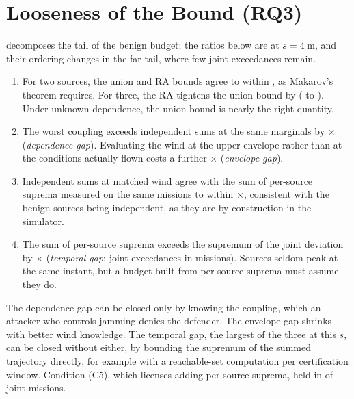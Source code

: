 \section{Looseness of the Bound (RQ3)}
\label{app:rq3}
 decomposes the tail of the benign budget; the ratios below are
at $s=4$\,m, and their ordering changes in the far tail, where few joint
exceedances remain.
\begin{enumerate}
\item For two sources, the union and RA bounds agree to within
  \nUnionRaDtwoMaxErr{}, as Makarov's theorem requires. For three, the RA
  tightens the union bound by \nRaGain{} (\nGapUnion{} to \nGapRa{}). Under
  unknown dependence, the union bound is nearly the right quantity.
\item The worst coupling exceeds independent sums at the same marginals by
  \nDepRatio$\times$ (\emph{dependence gap}). Evaluating the wind at the upper
  envelope rather than at the conditions actually flown costs a further
  \nEnvRatio$\times$ (\emph{envelope gap}).
\item Independent sums at matched wind agree with the sum of per-source
  suprema measured on the same missions to within \nNatRatio$\times$,
  consistent with the benign sources being independent, as they are by
  construction in the simulator.
\item The sum of per-source suprema exceeds the supremum of the joint deviation
  by \nTimeRatio$\times$ (\emph{temporal gap}; \nGapJointK{} joint exceedances in
  \nJointMissions{} missions). Sources seldom peak at the same instant, but a
  budget built from per-source suprema must assume they do.
\end{enumerate}
The dependence gap can be closed only by knowing the coupling, which an
attacker who controls jamming denies the defender. The envelope gap shrinks
with better wind knowledge. The temporal gap, the largest of the three at
this $s$, can be closed without either, by bounding the supremum of the summed trajectory
directly, for example with a reachable-set computation per certification
window. Condition (C5), which licenses adding per-source suprema, held in
\nSubaddSources{} of joint missions.

\figGap

